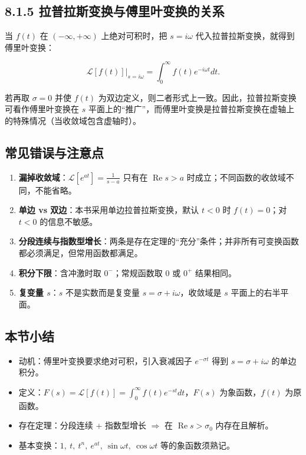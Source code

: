 \subsection{8.1.5
拉普拉斯变换与傅里叶变换的关系}\label{ux62c9ux666eux62c9ux65afux53d8ux6362ux4e0eux5085ux91ccux53f6ux53d8ux6362ux7684ux5173ux7cfb}

当 \(f(t)\) 在 \((-\infty,+\infty)\) 上绝对可积时，把 \(s=i\omega\)
代入拉普拉斯变换，就得到傅里叶变换：

\[
\mathcal{L}[f(t)]\bigr|_{s=i\omega}=\int_0^{\infty} f(t)e^{-i\omega t}dt .
\]

若再取 \(\sigma=0\) 并使 \(f(t)\)
为双边定义，则二者形式上一致。因此，拉普拉斯变换可看作傅里叶变换在 \(s\)
平面上的``推广''，而傅里叶变换是拉普拉斯变换在虚轴上的特殊情况（当收敛域包含虚轴时）。

\subsection{常见错误与注意点}\label{ux5e38ux89c1ux9519ux8befux4e0eux6ce8ux610fux70b9-21}

\begin{enumerate}
\def\labelenumi{\arabic{enumi}.}
\tightlist
\item
  \textbf{漏掉收敛域}：\(\mathcal{L}[e^{at}]=\frac{1}{s-a}\) 只有在
  \(\operatorname{Re}s>a\) 时成立；不同函数的收敛域不同，不能省略。
\item
  \textbf{单边 vs 双边}：本书采用单边拉普拉斯变换，默认 \(t<0\) 时
  \(f(t)=0\)；对 \(t<0\) 的信息不敏感。
\item
  \textbf{分段连续与指数型增长}：两条是存在定理的``充分''条件；并非所有可变换函数都必须满足，但常用函数都满足。
\item
  \textbf{积分下限}：含冲激时取 \(0^-\)；常规函数取 \(0\) 或 \(0^+\)
  结果相同。
\item
  \textbf{复变量 \(s\)}：\(s\) 不是实数而是复变量
  \(s=\sigma+i\omega\)，收敛域是 \(s\) 平面上的右半平面。
\end{enumerate}

\subsection{本节小结}\label{ux672cux8282ux5c0fux7ed3-21}

\begin{itemize}
\tightlist
\item
  动机：傅里叶变换要求绝对可积，引入衰减因子 \(e^{-\sigma t}\) 得到
  \(s=\sigma+i\omega\) 的单边积分。
\item
  定义：\(F(s)=\mathcal{L}[f(t)]=\int_0^{\infty}f(t)e^{-st}dt\)，\(F(s)\)
  为象函数，\(f(t)\) 为原函数。
\item
  存在定理：分段连续 + 指数型增长 \(\Rightarrow\) 在
  \(\operatorname{Re}s>\sigma_0\) 内存在且解析。
\item
  基本变换：\(1,\ t,\ t^n,\ e^{at},\ \sin\omega t,\ \cos\omega t\)
  等的象函数须熟记。
\end{itemize}

